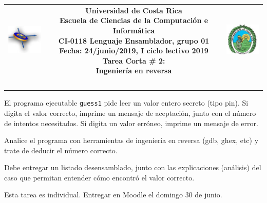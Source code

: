 \documentclass[12pt,letterpaper]{article}
\begin{document}
\begin{tabular}{ccc}
  \includegraphics[width=20mm]{ECCI.jpg}
  \hfill
  & 
  \parbox{5.2in}{ \centering 
                \textbf{Universidad de Costa Rica\\
                Escuela de Ciencias de la Computación e Informática\\
                CI-0118 Lenguaje Ensamblador, grupo 01\\
                Fecha: 24/junio/2019, I ciclo lectivo 2019\\
                \Large Tarea Corta \# 2:\\
                Ingeniería en reversa}\\
                \hrulefill
                }  
  & 
  \includegraphics[width=20mm]{UCR.jpg}\\ ~\\
 \end{tabular}

 El programa ejecutable \texttt{guess1} pide leer un valor entero secreto (tipo pin). Si digita el valor correcto, imprime un mensaje de aceptación, junto con el número de intentos necesitados. Si digita un valor erróneo, imprime un mensaje de error.
 
 Analice el programa con herramientas de ingeniería en reversa (gdb, ghex, etc) y trate de deducir el número correcto. 
 
 Debe entregar un listado desensamblado, junto con las explicaciones (análisis) del caso que permitan entender cómo encontró el valor correcto.

Esta tarea es individual. Entregar en Moodle el domingo 30 de junio.
\end{document}
